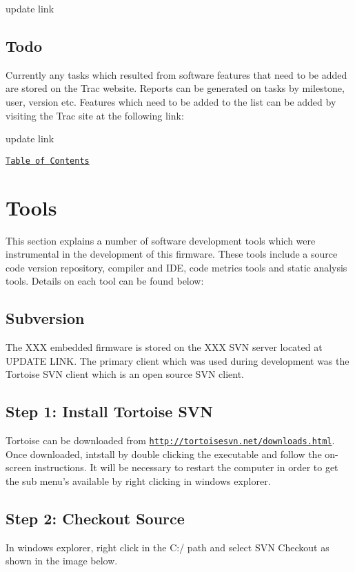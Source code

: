 update link\hypertarget{index_ToDo}{}\subsection{Todo}\label{index_ToDo}
Currently any tasks which resulted from software features that need to be added are stored on the Trac website. Reports can be generated on tasks by milestone, user, version etc. Features which need to be added to the list can be added by visiting the Trac site at the following link\-: \par
\par


update link

\par
\href{#Contents}{\tt Table of Contents}\par
 



\label{_Tools}%
\hypertarget{index_DevEnviron}{}\section{Tools}\label{index_DevEnviron}
This section explains a number of software development tools which were instrumental in the development of this firmware. These tools include a source code version repository, compiler and I\-D\-E, code metrics tools and static analysis tools. Details on each tool can be found below\-:\hypertarget{index_subversion}{}\subsection{Subversion}\label{index_subversion}
The X\-X\-X embedded firmware is stored on the X\-X\-X S\-V\-N server located at U\-P\-D\-A\-T\-E L\-I\-N\-K. The primary client which was used during development was the Tortoise S\-V\-N client which is an open source S\-V\-N client.\hypertarget{index_svn1}{}\subsection{Step 1\-: Install Tortoise S\-V\-N}\label{index_svn1}
Tortoise can be downloaded from \href{http://tortoisesvn.net/downloads.html}{\tt http\-://tortoisesvn.\-net/downloads.\-html}. Once downloaded, intstall by double clicking the executable and follow the on-\/screen instructions. It will be necessary to restart the computer in order to get the sub menu's available by right clicking in windows explorer.\hypertarget{index_svn2}{}\subsection{Step 2\-: Checkout Source}\label{index_svn2}
In windows explorer, right click in the C\-:/ path and select S\-V\-N Checkout as shown in the image below. 

